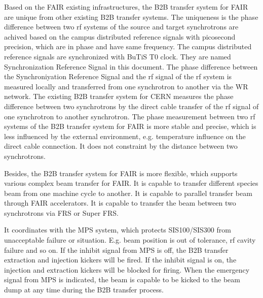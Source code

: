 Based on the FAIR existing infrastructures, the B2B transfer system for FAIR are unique from other existing B2B transfer systems. The uniqueness is the phase difference between two rf systems of the source and target synchrotrons are achived based on the campus distributed reference signals with picosecond precision, which are in phase and have same frequency. The campus distributed reference signals are synchronized with BuTiS T0 clock. They are named Synchronization Reference Signal in this document. The phase difference between the Synchroniyation Reference Signal and the rf signal of the rf system is measured locally and transferred from one synchrotron to another via the WR network. The existing B2B transfer system for CERN measures the phase difference between two synchrotrons by the direct cable transfer of the rf signal of one synchrotron to another synchrotron. The phase measurement between two rf systems of the B2B transfer system for FAIR is more stable and precise, which is less influenced by the external environment, e.g. temperature influence on the direct cable connection. It does not constraint by the distance between two synchrotrons.

Besides, the B2B transfer system for FAIR is more flexible, which supports various complex beam transfer for FAIR.  It is capable to transfer different species beam from one machine cycle to another.  It is capable to parallel transfer beam through FAIR accelerators. It is capable to transfer the beam between two synchrotrons via FRS or Super FRS. 

It coordinates with the MPS system, which protects SIS100/SIS300 from unacceptable failure or situation. E.g. beam position is out of tolerance, rf cavity failure and so on. If the inhibit signal from MPS is off, the B2B transfer extraction and injection kickers will be fired. If the inhibit signal is on, the injection and extraction kickers will be blocked for firing.  When the emergency signal from MPS is indicated, the beam is capable to be kicked to the beam dump at any time during the B2B transfer process.


